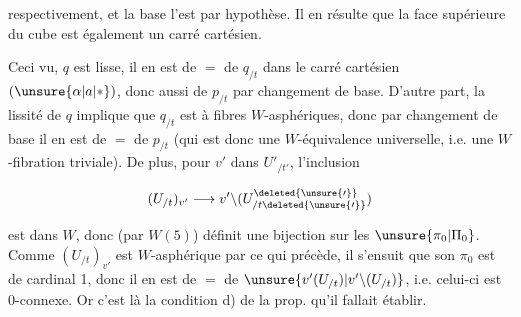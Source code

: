 
respectivement, et la base l'est par hypothèse. Il en résulte que la face supérieure du cube est également un carré cartésien.

Ceci vu,   $q$ est lisse, il en est de $=$ de $q_{/t}$ dans le carré cartésien $(\unsure{\alpha|a|*})$, donc aussi de $p_{/t}$ par changement de base. D'autre part, la lissité de $q$ implique que $q_{/t}$ est à fibres $W$-asphériques, donc par changement de base il en est de $=$ de $p_{/t}$ (qui est donc une $W$-équivalence universelle, i.e. une $W$-fibration triviale). De plus,  pour $v'$ dans $U'_{/t'}$, l'inclusion

\[
(U_{/t})_{v'}\longrightarrow v'\backslash(U^{\deleted{\unsure{\prime}}}_{/t\deleted{\unsure{\prime}}})
\]

est dans $W$, donc (par $W(5)$) définit une bijection sur les $\unsure{\pi_0|\Pi_0}$. Comme $(U_{/t})_{v'}$ est $W$-asphérique par ce qui précède, il s'ensuit  que son $\pi_0$ est de cardinal 1, donc il en est de $=$ de $\unsure{v'(U_{/t})|v'\backslash(U_{/t})}$, i.e. celui-ci est $0$-connexe. Or c'est là la condition d) de la prop.  qu'il fallait établir.
